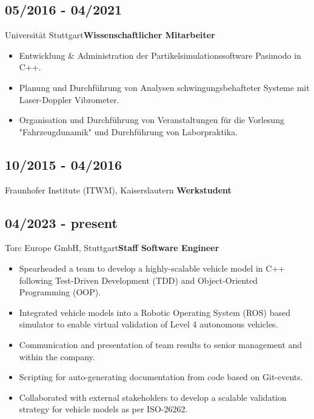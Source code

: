 \documentclass{mycv}
\begin{document}
\begin{paracol}{2}
{        \subsection{05/2016 - 04/2021}{Universit{\"a}t
            Stuttgart}{{\bfseries Wissenschaftlicher Mitarbeiter}}
           \begin{itemize}
               \item Entwicklung \& Administration der Partikelsimulationssoftware
                   Pasimodo in C++.
               \item Planung und Durchf{\"u}hrung von Analysen
                   schwingungsbehafteter Systeme mit Laser-Doppler Vibrometer.
               \item Organisation und Durchf{\"u}hrung von Veranstaltungen f{\"u}r
                   die Vorlesung "Fahrzeugdunamik" und Durchf{\"u}hrung von
                   Laborpraktika.
           \end{itemize}

        \subsection{10/2015 - 04/2016}{Fraunhofer Institute (ITWM), Kaiserslautern}
            {{\bfseries Werkstudent}}\\
}
{
    \subsection{04/2023 - present}{Torc Europe GmbH, Stuttgart}{{\bfseries Staff Software Engineer}}
          \begin{itemize}
            \item Spearheaded a team to develop a highly-scalable
                vehicle model in C++ following Test-Driven Development
                (TDD) and Object-Oriented Programming (OOP).
            \item Integrated vehicle models into a Robotic Operating System (ROS)
                based simulator to enable virtual validation of Level 4
                autonomous vehicles.
            \item Communication and presentation of team results to senior management and within the company.
            \item Scripting for auto-generating documentation from code based on Git-events.
            \item Collaborated with external stakeholders to develop a scalable
                validation strategy for vehicle models as per ISO-26262.
          \end{itemize}
    
}
\end{paracol}
\end{document}

